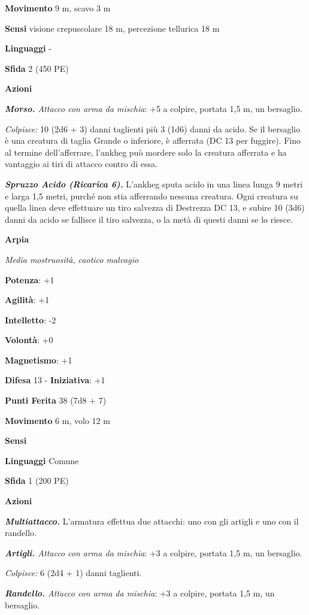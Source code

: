 \begin{multicols}{2}
\textbf{Movimento} 9 m, scavo 3 m

\textbf{Sensi} visione crepuscolare 18 m, percezione tellurica 18 m

\textbf{Linguaggi} -

\textbf{Sfida} 2 (450 PE)

\textbf{Azioni}

\emph{\textbf{Morso.} Attacco con arma da mischia}: +5 a colpire,
portata 1,5 m, un bersaglio.

\emph{Colpisce:} 10 (2d6 + 3) danni taglienti più 3 (1d6) danni da
acido. Se il bersaglio è una creatura di taglia Grande o inferiore, è
afferrata (DC 13 per fuggire). Fino al termine dell'afferrare, l'ankheg
può mordere solo la creatura afferrata e ha vantaggio ai tiri di attacco
contro di essa.

\emph{\textbf{Spruzzo Acido (Ricarica 6).}} L'ankheg sputa acido in una
linea lunga 9 metri e larga 1,5 metri, purché non stia afferrando
nessuna creatura. Ogni creatura su quella linea deve effettuare un tiro
salvezza di Destrezza DC 13, e subire 10 (3d6) danni da acido se
fallisce il tiro salvezza, o la metà di questi danni se lo riesce.

\textbf{Arpia}

\emph{Media mostruosità, caotico malvagio}

\textbf{Potenza}: +1

\textbf{Agilità}: +1

\textbf{Intelletto}: -2

\textbf{Volontà}: +0

\textbf{Magnetismo}: +1

\textbf{Difesa} 13 - \textbf{Iniziativa}: +1

\textbf{Punti Ferita} 38 (7d8 + 7)

\textbf{Movimento} 6 m, volo 12 m

\textbf{Sensi} 

\textbf{Linguaggi} Comune

\textbf{Sfida} 1 (200 PE)

\textbf{Azioni}

\emph{\textbf{Multiattacco.}} L'armatura effettua due attacchi: uno con
gli artigli e uno con il randello.

\emph{\textbf{Artigli.} Attacco con arma da mischia}: +3 a colpire,
portata 1,5 m, un bersaglio.

\emph{Colpisce:} 6 (2d4 + 1) danni taglienti.

\emph{\textbf{Randello.} Attacco con arma da mischia}: +3 a colpire,
portata 1,5 m, un bersaglio.


\end{multicols}
